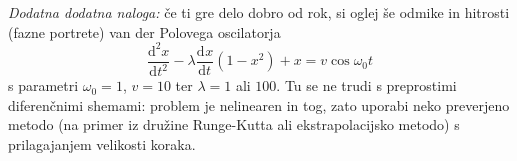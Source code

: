 \documentclass[slovene,11pt,a4paper]{article}
\newcommand{\ddd}{\mathrm{d}}
\newcommand{\Dd}[3][{}]{\frac{\ddd^{#1} #2}{\ddd #3^{#1}}}
\begin{document}
\bigskip

{\it Dodatna dodatna naloga\/:} če ti gre delo dobro od rok,
si oglej še odmike in hitrosti (fazne portrete) van der Polovega oscilatorja
\begin{equation*}
\Dd[2]{x}{t} - \lambda\Dd{x}{t}
\left( 1 - x^2 \right) + x = v\cos\omega_0t
\end{equation*}
s parametri $\omega_0=1$, $v=10$ ter $\lambda=1$ ali $100$.
Tu se ne trudi s preprostimi diferenčnimi shemami: problem
je nelinearen in tog, zato uporabi neko preverjeno metodo
(na primer iz družine Runge-Kutta ali ekstrapolacijsko
metodo) s prilagajanjem velikosti koraka.

\end{document}
